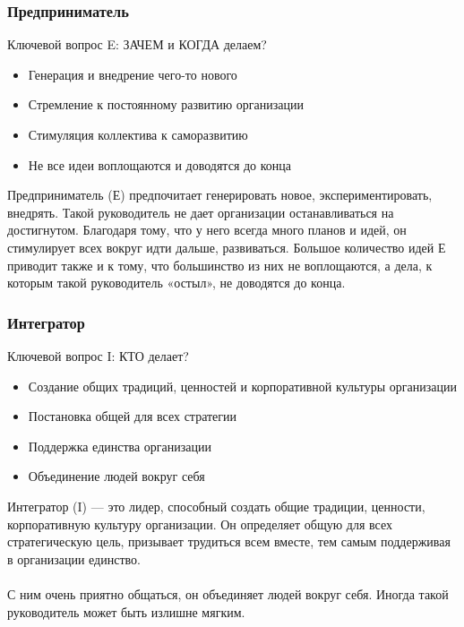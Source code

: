 \documentclass{../industrial-development}
\begin{document}
{\begin{frame} \frametitle{Предприниматель}
	\begin{block}{Ключевой вопрос E:}
		ЗАЧЕМ и КОГДА делаем?
	\end{block}	
 \begin{itemize}
	 \item Генерация и внедрение чего-то нового
	 \item Стремление к постоянному развитию организации
	 \item Стимуляция коллектива к саморазвитию
	 \item Не все идеи воплощаются и доводятся до конца
 \end{itemize}
\end{frame}
\lecturenotes
Предприниматель (Е) предпочитает генерировать новое, экспериментировать, внедрять. Такой руководитель не дает организации останавливаться на достигнутом. Благодаря тому, что у него всегда много планов и идей, он стимулирует всех вокруг идти дальше, развиваться. Большое количество идей Е приводит также и к тому, что большинство из них не воплощаются, а дела, к которым такой руководитель «остыл», не доводятся до конца. 

\begin{frame} \frametitle{Интегратор}
	\begin{block}{Ключевой вопрос I:}
		КТО делает?
	\end{block}	
 \begin{itemize}
	 \item Создание общих традиций, ценностей и корпоративной культуры организации
	 \item Постановка общей для всех стратегии
	 \item Поддержка единства организации
	 \item Объединение людей вокруг себя
 \end{itemize}
\end{frame}
\lecturenotes
Интегратор (I) — это лидер, способный создать общие традиции, ценности, корпоративную культуру организации. Он определяет общую для всех стратегическую цель, призывает трудиться всем вместе, тем самым поддерживая в организации единство. \\~\\ С ним очень приятно общаться, он объединяет людей вокруг себя. Иногда такой руководитель может быть излишне мягким.

}
\end{document}

